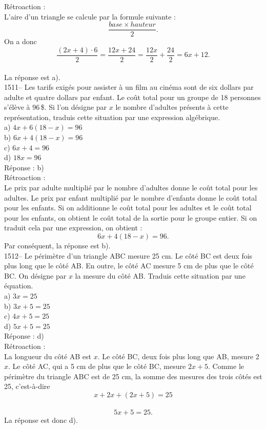 R\'etroaction :\\
L'aire d'un triangle se calcule par la formule suivante :
$$\frac{base\times hauteur}{2}.$$ On a donc $$\frac{(2x+4)\cdot
6}{2}=\frac{12x+24}{2}=\frac{12x}{2}+\frac{24}{2}=6x+12.$$\\
La r\'eponse est a).\\

1511-- Les tarifs exig\'es pour assister \`a un film au cin\'ema sont
de six dollars par adulte et quatre dollars par enfant. Le co\^ut
total pour un groupe de 18 personnes s'\'el\`eve \`a 96\,\$. Si l'on
d\'esigne par $x$ le nombre d'adultes pr\'esents \`a cette
repr\'esentation, traduis cette
situation par une expression alg\'ebrique.\\
a) $4x+6(18-x)=96$\\
b) $6x+4(18-x)=96$\\
c) $6x+4=96$\\
d) $18x=96$\\

R\'eponse : b)\\

R\'etroaction :\\
Le prix par adulte multipli\'e par le nombre d'adultes donne le
co\^ut total pour les adultes. Le prix par enfant multipli\'e par le
nombre d'enfants donne le co\^ut total pour les enfants. Si on
additionne le co\^ut total pour les adultes et le co\^ut total pour
les enfants, on obtient le co\^ut total de la sortie pour le groupe
entier. Si on traduit cela par une expression, on
obtient :$$6x+4(18-x)=96.$$ Par cons\'equent, la r\'eponse est b).\\

1512-- Le p\'erim\`etre d'un triangle ABC mesure 25 cm. Le c\^ot\'e
BC est deux fois plus long que le c\^ot\'e AB. En outre, le c\^ot\'e
AC mesure 5 cm de plus que le c\^ot\'e BC. On d\'esigne par $x$ la
mesure du c\^ot\'e AB. Traduis cette situation par une \'equation.\\
a) $3x=25$\\
b) $3x+5=25$\\
c) $4x+5=25$\\
d) $5x+5=25$\\

R\'eponse : d)\\

R\'etroaction :\\
La longueur du c\^ot\'e AB est $x$. Le c\^ot\'e BC, deux fois plus
long que AB, mesure 2$x$. Le c\^ot\'e AC, qui a 5 cm de plus que le
c\^ot\'e BC, mesure $2x+5$. Comme le p\'erim\`etre du triangle ABC
est de 25 cm, la somme des mesures des trois c\^ot\'es est 25,
c'est-\`a-dire $$x+ 2x+(2x+5)=25$$\
$$5x+5=25.$$ La r\'eponse est donc d).\\

